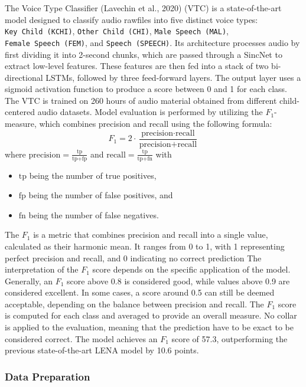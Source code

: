 \documentclass[
  man,floatsintext]{apa6}
\providecommand{\tightlist}{%
  \setlength{\itemsep}{0pt}\setlength{\parskip}{0pt}}
\begin{document}
The Voice Type Classifier (Lavechin et al., 2020) (VTC) is a state-of-the-art model designed to classify audio rawfiles into five distinct voice types: \texttt{Key\ Child\ (KCHI)}, \texttt{Other\ Child\ (CHI)}, \texttt{Male\ Speech\ (MAL)}, \texttt{Female\ Speech\ (FEM)}, and \texttt{Speech\ (SPEECH)}. Its architecture processes audio by first dividing it into 2-second chunks, which are passed through a SincNet to extract low-level features. These features are then fed into a stack of two bi-directional LSTMs, followed by three feed-forward layers. The output layer uses a sigmoid activation function to produce a score between 0 and 1 for each class. The VTC is trained on 260 hours of audio material obtained from different child-centered audio datasets. Model evaluation is performed by utilizing the \(F_1\)-measure, which combines precision and recall using the following formula:
\[
F_1 = 2 \cdot \frac{\text{precision} \cdot \text{recall}}{\text{precision} + \text{recall}}
\]
where \(\text{precision} = \frac{\text{tp}}{\text{tp} + \text{fp}}\) and \(\text{recall} = \frac{\text{tp}}{\text{tp} + \text{fn}}\) with

\begin{itemize}
\tightlist
\item
  \(\text{tp}\) being the number of true positives,
\item
  \(\text{fp}\) being the number of false positives, and
\item
  \(\text{fn}\) being the number of false negatives.
\end{itemize}

The \(F_1\) is a metric that combines precision and recall into a single value, calculated as their harmonic mean. It ranges from 0 to 1, with 1 representing perfect precision and recall, and 0 indicating no correct prediction The interpretation of the \(F_1\) score depends on the specific application of the model. Generally, an \(F_1\) score above 0.8 is considered good, while values above 0.9 are considered excellent. In some cases, a score around 0.5 can still be deemed acceptable, depending on the balance between precision and recall. The \(F_1\) score is computed for each class and averaged to provide an overall measure. No collar is applied to the evaluation, meaning that the prediction have to be exact to be considered correct. The model achieves an \(F_1\) score of 57.3, outperforming the previous state-of-the-art LENA model by 10.6 points.

\subsubsection{Data Preparation}\label{data-preparation-1}
\end{document}
